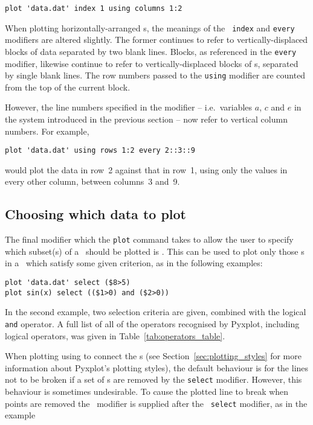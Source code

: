\begin{verbatim}
plot 'data.dat' index 1 using columns 1:2
\end{verbatim}

When plotting horizontally-arranged \datafile s, the meanings of the {\tt
index} and {\tt every} modifiers are altered slightly. The former continues to
refer to vertically-displaced blocks of data separated by two blank lines.
Blocks, as referenced in the {\tt every} modifier, likewise continue to refer
to vertically-displaced blocks of \datapoint s, separated by single blank
lines. The row numbers passed to the {\tt using} modifier are counted from the
top of the current block.

However, the line numbers specified in the  modifier -- i.e.\
variables $a$, $c$ and $e$ in the system introduced in the previous section --
now refer to vertical column numbers. For example,

\begin{verbatim}
plot 'data.dat' using rows 1:2 every 2::3::9
\end{verbatim}

\noindent would plot the data in row~2 against that in row~1, using only the
values in every other column, between columns~3 and~9.

\subsection{Choosing which data to plot}
\label{sec:select_modifier}

The final modifier which the {\tt plot} command takes to allow the user to
specify which subset(s) of a \datafile\ should be plotted is .
This can be used to plot only those \datapoint s in a \datafile\ which satisfy
some given criterion, as in the following examples:

\begin{verbatim}
plot 'data.dat' select ($8>5)
plot sin(x) select (($1>0) and ($2>0))
\end{verbatim}

\noindent In the second example, two selection criteria are given, combined
with the logical {\tt and} operator. A full list of all of the operators
recognised by Pyxplot, including logical operators, was given in
Table~\ref{tab:operators_table}.

When plotting using  to connect the \datapoint s (see
Section~\ref{sec:plotting_styles} for more information about Pyxplot's plotting
styles), the default behaviour is for the lines not to be broken if a set of
\datapoint s are removed by the {\tt select} modifier.  However, this behaviour
is sometimes undesirable.  To cause the plotted line to break when points are
removed the \indmodt{discontinuous}\ modifier is supplied after the {\tt
select} modifier, as in the example

